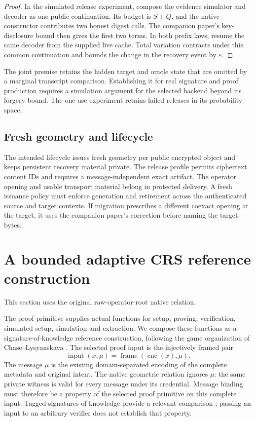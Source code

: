 \begin{proof}
In the simulated release experiment, compose the evidence simulator and
decoder as one public continuation. Its budget is \(S+Q\), and the native
constructor contributes two honest digest calls. The companion paper's
key-disclosure bound then gives the first two terms. In both prefix laws,
resume the same decoder from the supplied live cache. Total variation
contracts under this common continuation and bounds the change in the
recovery event by \(\varepsilon\).
\end{proof}

The joint premise retains the hidden target and oracle state that are
omitted by a marginal transcript comparison. Establishing it for real
signature and proof production requires a simulation argument for the
selected backend beyond its forgery bound. The one-use experiment retains
failed releases in its probability space.

\subsection{Fresh geometry and lifecycle}

The intended lifecycle issues fresh geometry per public encrypted object
and keeps persistent recovery material private. The release profile permits
ciphertext content IDs and requires a message-independent exact artifact.
The operator opening and usable transport material belong in protected
delivery. A fresh issuance policy must enforce generation and retirement
across the authenticated source and target contexts. If migration prescribes
a different coexact opening at the target, it uses the companion paper's
correction before naming the target bytes.

\section{A bounded adaptive CRS reference construction}

This section uses the original raw-operator-root native relation.

The proof primitive supplies actual functions for setup, proving,
verification, simulated setup, simulation and extraction. We compose these
functions as a signature-of-knowledge reference construction, following the
game organization of Chase--Lysyanskaya
\cite[Section 2.2]{chaseLysyanskaya2006signaturesKnowledge}. The selected proof
input is the injectively framed pair
\[
 \operatorname{input}(x,\mu)=\operatorname{frame}(\operatorname{enc}(x),\mu).
\]
The message \(\mu\) is the existing domain-separated encoding of the complete
metadata and original intent. The native geometric relation ignores \(\mu\):
the same private witness is valid for every message under its credential.
Message binding must therefore be a property of the selected proof primitive
on this complete input. Tagged signatures of knowledge provide a relevant
comparison \cite[Section 5.2]{bagheryEtAl2022signaturesKnowledge}; passing an
input to an arbitrary verifier does not establish that property.

